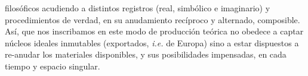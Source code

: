 filosóficos acudiendo a distintos registros (real, simbólico e imaginario) y procedimientos de verdad, en su anudamiento recíproco y alternado, composible. Así, que nos inscribamos en este modo de producción teórica no obedece a captar núcleos ideales inmutables (exportados, \emph{i.e.} de Europa) sino a estar dispuestos a re-anudar los materiales disponibles, y sus posibilidades impensadas, en cada tiempo y espacio singular.
%
%
